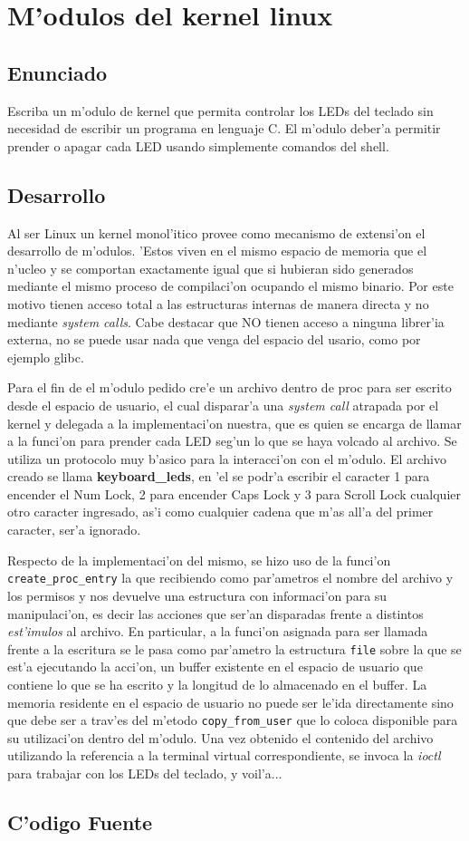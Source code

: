 \section{M'odulos del kernel linux}
\subsection{Enunciado}
Escriba un m'odulo de kernel que permita controlar los LEDs del teclado sin necesidad de escribir un programa en lenguaje C. El m'odulo deber'a permitir prender o apagar cada LED usando simplemente comandos del shell.
\subsection{Desarrollo}
Al ser Linux un kernel monol'itico provee como mecanismo de extensi'on el desarrollo de m'odulos. 'Estos viven en el mismo espacio de memoria que el n'ucleo y se comportan exactamente igual que si hubieran sido generados mediante el mismo proceso de compilaci'on ocupando el mismo binario. Por este motivo tienen acceso total a las estructuras internas de manera directa y no mediante \emph{system calls}. Cabe destacar que NO tienen acceso a ninguna librer'ia externa, no se puede usar nada que venga del espacio del usario, como por ejemplo glibc.

Para el fin de el m'odulo pedido cre'e un archivo dentro de proc para ser escrito desde el espacio de usuario, el cual disparar'a una \emph{system call} atrapada por el kernel y delegada a la implementaci'on nuestra, que es quien se encarga de llamar a la funci'on para prender cada LED seg'un lo que se haya volcado al archivo. Se utiliza un protocolo muy b'asico para la interacci'on con el m'odulo. El archivo creado se llama \textbf{keyboard\_leds}, en 'el se podr'a escribir el caracter 1 para encender el Num Lock, 2 para encender Caps Lock y 3 para Scroll Lock cualquier otro caracter ingresado, as'i como cualquier cadena que m'as all'a del primer caracter, ser'a ignorado.

Respecto de la implementaci'on del mismo, se hizo uso de la funci'on \texttt{create\_proc\_entry} la que recibiendo como par'ametros el nombre del archivo y los permisos y nos devuelve una estructura con informaci'on para su manipulaci'on, es decir las acciones que ser'an disparadas frente a distintos \emph{est'imulos} al archivo. En particular, a la funci'on asignada para ser llamada frente a la escritura se le pasa como par'ametro la estructura \texttt{file} sobre la que se est'a ejecutando la acci'on, un buffer existente en el espacio de usuario que contiene lo que se ha escrito y la longitud de lo almacenado en el buffer. La memoria residente en el espacio de usuario no puede ser le'ida directamente sino que debe ser a trav'es del m'etodo \texttt{copy\_from\_user} que lo coloca disponible para su utilizaci'on dentro del m'odulo. Una vez obtenido el contenido del archivo utilizando la referencia a la terminal virtual correspondiente, se invoca la \emph{ioctl} para trabajar con los LEDs del teclado, y voil'a...
\subsection{C'odigo Fuente}
    
